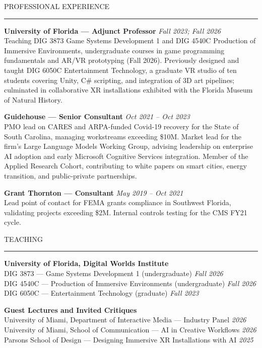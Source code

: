 \documentclass{resume} %
\renewenvironment{rSection}[1]{
  \needspace{4\baselineskip}
  \sectionskip
  \textcolor{CustomRed}{\MakeUppercase{#1}}
  \sectionlineskip
  \hrule
  \begin{list}{}{
    \setlength{\leftmargin}{1.5em}
  }
  \item[]
}{
  \end{list}
}
\begin{document}
\begin{rSection}{Professional Experience}
\textbf{University of Florida --- Adjunct Professor} \hfill \emph{Fall 2023; Fall 2026}\\
Teaching DIG 3873 Game Systems Development 1 and DIG 4540C Production of Immersive
Environments, undergraduate courses in game programming fundamentals and AR/VR
prototyping (Fall 2026). Previously designed and taught DIG 6050C Entertainment
Technology, a graduate VR studio of ten students covering Unity, C\# scripting, and
integration of 3D art pipelines; culminated in collaborative XR installations
exhibited with the Florida Museum of Natural History.

\textbf{Guidehouse --- Senior Consultant} \hfill \emph{Oct 2021 -- Oct 2023}\\
PMO lead on CARES and ARPA-funded Covid-19 recovery for the State of South Carolina, managing workstreams exceeding \$10M. Market lead for the firm's Large Language Models Working Group, advising leadership on enterprise AI adoption and early Microsoft Cognitive Services integration. Member of the Applied Research Cohort, contributing to white papers on smart cities, energy transition, and public-private partnerships.

\textbf{Grant Thornton --- Consultant} \hfill \emph{May 2019 -- Oct 2021}\\
Lead point of contact for FEMA grants compliance in Southwest Florida, validating projects exceeding \$2M. Internal controls testing for the CMS FY21 cycle.
\end{rSection}

\begin{rSection}{Teaching}
\textbf{University of Florida, Digital Worlds Institute} \\
DIG 3873 --- Game Systems Development 1 (undergraduate) \hfill \emph{Fall 2026}\\
DIG 4540C --- Production of Immersive Environments (undergraduate) \hfill \emph{Fall 2026}\\
DIG 6050C --- Entertainment Technology (graduate) \hfill \emph{Fall 2023}

\vspace{0.4em}
\textbf{Guest Lectures and Invited Critiques}\\
University of Miami, Department of Interactive Media --- Industry Panel \hfill \emph{2026}\\
University of Miami, School of Communication --- AI in Creative Workflows \hfill \emph{2026}\\
Parsons School of Design --- Designing Immersive XR Installations with AI \hfill \emph{2025}
\end{rSection}
\end{document}
